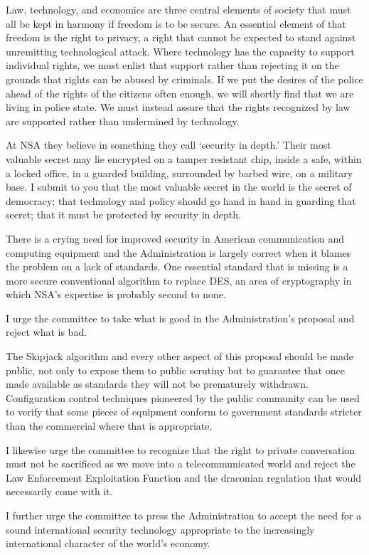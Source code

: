 \para Law, technology, and economics are three central elements of
society that must all be kept in harmony if freedom is to be secure.
An essential element of that freedom is the right to privacy, a right
that cannot be expected to stand against unremitting technological
attack.  Where technology has the capacity to support individual
rights, we must enlist that support rather than rejecting it on the
grounds that rights can be abused by criminals.  If we put the desires
of the police ahead of the rights of the citizens often enough, we
will shortly find that we are living in police state.  We must instead
assure that the rights recognized by law are supported rather than
undermined by technology. \endpara

\para At NSA they believe in something they call `security in depth.'
Their most valuable secret may lie encrypted on a tamper resistant
chip, inside a safe, within a locked office, in a guarded building,
surrounded by barbed wire, on a military base.  I submit to you that
the most valuable secret in the world is the secret of democracy; that
technology and policy should go hand in hand in guarding that secret;
that it must be protected by security in depth. \endpara


\par\vfill\eject
{}

\para There is a crying need for improved security in American
communication and computing equipment and the Administration is
largely correct when it blames the problem on a lack of standards.
One essential standard that is missing is a more secure conventional
algorithm to replace DES, an area of cryptography in which NSA's
expertise is probably second to none.  \endpara

\para I urge the committee to take what is good in the
Administration's proposal and reject what is bad. \begdis

 \list{\bullets}
  \item The Skipjack algorithm and every other aspect of this proposal
        should be made public, not only to expose them to public
        scrutiny but to guarantee that once made available as
        standards they will not be prematurely withdrawn.
        Configuration control techniques pioneered by the public
        community can be used to verify that some pieces of equipment
        conform to government standards stricter than the commercial
        where that is appropriate.

  \item I likewise urge the committee to recognize that the right
        to private conversation must not be sacrificed as we move
        into a telecommunicated world and reject the Law Enforcement
        Exploitation Function and the draconian regulation that would
        necessarily come with it.

  \item I further urge the committee to press the Administration
        to accept the need for a sound international security
        technology appropriate to the increasingly international
        character of the world's economy.
  \endlist

\enddoc

